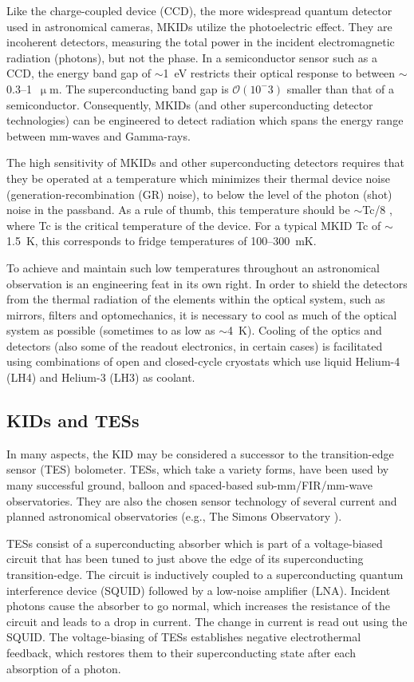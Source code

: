 Like the charge-coupled device (CCD), the more widespread quantum detector used in astronomical cameras, MKIDs utilize the photoelectric effect. They are incoherent detectors, measuring the total power in the incident electromagnetic radiation (photons), but not the phase. In a semiconductor sensor such as a CCD, the energy band gap of $\sim$1~eV restricts their optical response to between $\sim$0.3--1~$\upmu$m. The superconducting band gap is $\mathcal{O}(10^-3)$ smaller than that of a semiconductor. Consequently, MKIDs (and other superconducting detector technologies) can be engineered to detect radiation which spans the energy range between mm-waves and Gamma-rays.

The high sensitivity of MKIDs and other superconducting detectors requires that they be operated at a temperature which minimizes their thermal device noise (generation-recombination (GR) noise), to below the level of the photon (shot) noise in the passband. As a rule of thumb, this temperature should be $\sim$\gls{Tc}/8 \citep{mazin2013arcons}, where \gls{Tc} is the critical temperature of the device. For a typical MKID \gls{Tc} of $\sim$1.5~K, this corresponds to fridge temperatures of 100--300~mK.

To achieve and maintain such low temperatures throughout an astronomical observation is an engineering feat in its own right. In order to shield the detectors from the thermal radiation of the elements within the optical system, such as mirrors, filters and optomechanics, it is necessary to cool as much of the optical system as possible (sometimes to as low as $\sim$4~K). Cooling of the optics and detectors (also some of the readout electronics, in certain cases) is facilitated using combinations of open and closed-cycle cryostats which use liquid Helium-4 (LH4) and Helium-3 (LH3) as coolant.

\subsection{KIDs and TESs}

In many aspects, the KID may be considered a successor to the transition-edge sensor (TES) bolometer. TESs, which take a variety forms, have been used by many successful ground, balloon and spaced-based sub-mm/FIR/mm-wave observatories. They are also the chosen sensor technology of several current and planned astronomical observatories (e.g., The Simons Observatory \citep{ade2019simons}).

TESs consist of a superconducting absorber which is part of a voltage-biased circuit that has been tuned to just above the edge of its superconducting transition-edge. The circuit is inductively coupled to a superconducting quantum interference device (SQUID) followed by a low-noise amplifier (LNA). Incident photons cause the absorber to go normal, which increases the resistance of the circuit and leads to a drop in current. The change in current is read out using the SQUID\@. The voltage-biasing of TESs establishes negative electrothermal feedback, which restores them to their superconducting state after each absorption of a photon.

